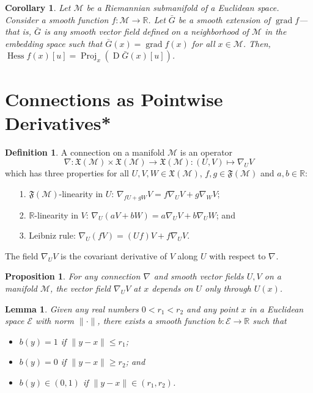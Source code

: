 \documentclass{article}
\theoremstyle{plain}
\newtheorem{proposition}[theorem]{Proposition}
\newtheorem{corollary}[theorem]{Corollary}
\newtheorem{lemma}[theorem]{Lemma}
\theoremstyle{definition}
\newtheorem{definition}[theorem]{Definition}
\newcommand{\Proj}[2]{\operatorname{Proj}_{#1}{\left(#2\right)}}
\newcommand{\VecF}[1]{\mathfrak{X}(\mathcal{#1})}
\newcommand{\SmFunc}[1]{\mathfrak{F}(\mathcal{#1})}
\newcommand{\Conn}[3]{#1\nabla_{#2}{#3}}
\def\bbR{\mathbb{R}}
\def\calE{\mathcal{E}}
\def\calM{\mathcal{M}}
\begin{document}
\begin{corollary}
Let $\calM$ be a Riemannian submanifold of a Euclidean space. 
Consider a smooth function $f : \calM \to \bbR$. Let $\bar G$ be a smooth extension of $\operatorname{grad}f$—
that is, $\bar G$ is any smooth vector field defined on a neighborhood of $\calM$ in the embedding space such that $\bar G(x) = \operatorname{grad}f(x)$ for all $x \in \calM$. 
Then, $\operatorname{Hess}f(x)[u] = \Proj{x}{\operatorname{D}\bar G(x)[u]}$. 
\end{corollary}

\section{Connections as Pointwise Derivatives*}
\begin{definition}
A connection on a manifold $\calM$ is an operator
$$\nabla \colon \VecF{M} \times \VecF{M} \to \VecF{M}: (U,V) \mapsto \Conn{}{U}{V}$$
which has three properties for all $U ,V , W \in \VecF{M}$, $f, g \in \SmFunc{M}$ and $a, b \in \bbR$:
\begin{enumerate}
\item[1.] $\SmFunc{M}$-linearity in $U$: $\Conn{}{fU+gW}{V} = f\Conn{}{U}{V} + g\Conn{}{W}{V}$;
\item[2.] $\bbR$-linearity in $V$: $\Conn{}{U}{(aV+bW)} = a\Conn{}{U}{V} + b\Conn{}{U}{W}$; and
\item[3.] Leibniz rule: $\Conn{}{U}{(fV)} = (Uf)V + f \Conn{}{U}{V}$. 
\end{enumerate}
The field $\Conn{}{U}{V}$ is the covariant derivative of $V$ along $U$ with respect to $\Conn{}{}{}$. 
\end{definition}

\begin{proposition}
For any connection $\Conn{}{}{}$ and smooth vector fields $U,V$ on a manifold $\calM$, the vector field $\Conn{}{U}{V}$ at $x$ depends on $U$ only through $U(x)$.
\end{proposition}

\begin{lemma}
Given any real numbers $0 < r_1 < r_2$ and any point $x$ in a Euclidean space $\calE$ with norm $\|\cdot\|$, there exists a smooth function $b: \calE \to \bbR$ such that 
\begin{itemize}
\item $b(y) = 1$ if $\parallel y - x \parallel \leq r_1$; 
\item $b(y) = 0$ if $\parallel y - x \parallel \geq r_2$; and 
\item $b(y) \in (0,1)$ if $\parallel y - x \parallel \in (r_1, r_2)$. 
\end{itemize}
\end{lemma}
\end{document}
